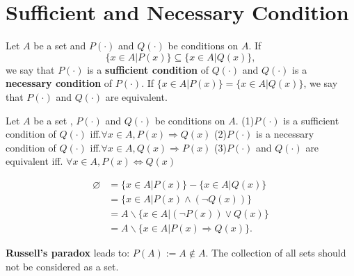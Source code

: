\documentclass{book}
\numberwithin{equation}{section}
\begin{document}
\section{Sufficient and Necessary Condition}
\begin{definitionenv}
    Let $A$ be a set and $P(\cdot)$ and $Q(\cdot)$ be conditions on $A$.
    If $$\{x\in A|P(x)\}\subseteq\{x\in A|Q(x)\}, $$ we say that $P(\cdot)$ is a \textbf{sufficient condition} of $Q(\cdot)$ and $Q(\cdot)$ is a \textbf{necessary condition} of $P(\cdot)$. 
    If $\{x\in A|P(x)\}=\{x\in A|Q(x)\}$, we say that $P(\cdot)$ and $Q(\cdot)$ are equivalent.
\end{definitionenv}
\begin{propositionenv}
    Let $A$ be a set , $P(\cdot)$ and $Q(\cdot)$ be conditions on $A$.
    \newline
    (1)$P(\cdot)$ is a sufficient condition of $Q(\cdot)$ iff.$\forall x\in A, P(x)\Rightarrow Q(x)$
    \newline
    (2)$P(\cdot) $ is a necessary condition of $Q(\cdot)$ iff.$\forall x\in A, Q(x)\Rightarrow P(x)$
    \newline
    (3)$P(\cdot)$ and $Q(\cdot)$ are equivalent iff. $\forall x\in A, P(x)\Leftrightarrow Q(x)$
\end{propositionenv}
\begin{proofenv}
\begin{align*}
    \varnothing&=\{x\in A|P(x)\}- \{x\in A|Q(x)\}\\
    &=\{x\in A|P(x)\wedge (\neg Q(x))\}\\
    &=A\backslash\{x\in A|(\neg P(x))\vee  Q(x)\}\\
    &=A\backslash\{x\in A |P(x)\Rightarrow Q(x)\}.
\end{align*}
\end{proofenv}
\textbf{Russell's paradox} leads to: $P(A):=A\notin A$. The collection of all sets should not be considered as a set.
\end{document}
